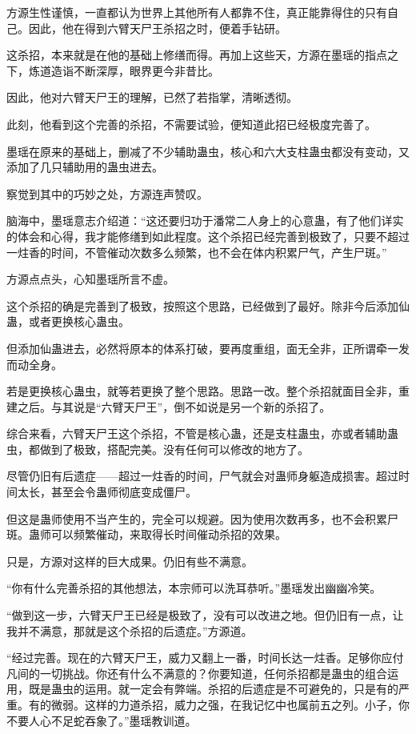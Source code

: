 
\begin{this_body}

方源生性谨慎，一直都认为世界上其他所有人都靠不住，真正能靠得住的只有自己。因此，他在得到六臂天尸王杀招之时，便着手钻研。

这杀招，本来就是在他的基础上修缮而得。再加上这些天，方源在墨瑶的指点之下，炼道造诣不断深厚，眼界更今非昔比。

因此，他对六臂天尸王的理解，已然了若指掌，清晰透彻。

此刻，他看到这个完善的杀招，不需要试验，便知道此招已经极度完善了。

墨瑶在原来的基础上，删减了不少辅助蛊虫，核心和六大支柱蛊虫都没有变动，又添加了几只辅助用的蛊虫进去。

察觉到其中的巧妙之处，方源连声赞叹。

脑海中，墨瑶意志介绍道：“这还要归功于潘常二人身上的心意蛊，有了他们详实的体会和心得，我才能修缮到如此程度。这个杀招已经完善到极致了，只要不超过一炷香的时间，不管催动次数多么频繁，也不会在体内积累尸气，产生尸斑。”

方源点点头，心知墨瑶所言不虚。

这个杀招的确是完善到了极致，按照这个思路，已经做到了最好。除非今后添加仙蛊，或者更换核心蛊虫。

但添加仙蛊进去，必然将原本的体系打破，要再度重组，面无全非，正所谓牵一发而动全身。

若是更换核心蛊虫，就等若更换了整个思路。思路一改。整个杀招就面目全非，重建之后。与其说是“六臂天尸王”，倒不如说是另一个新的杀招了。

综合来看，六臂天尸王这个杀招，不管是核心蛊，还是支柱蛊虫，亦或者辅助蛊虫，都做到了极致，搭配完美。没有任何可以修改的地方了。

尽管仍旧有后遗症——超过一炷香的时间，尸气就会对蛊师身躯造成损害。超过时间太长，甚至会令蛊师彻底变成僵尸。

但这是蛊师使用不当产生的，完全可以规避。因为使用次数再多，也不会积累尸斑。蛊师可以频繁催动，来取得长时间催动杀招的效果。

只是，方源对这样的巨大成果。仍旧有些不满意。

“你有什么完善杀招的其他想法，本宗师可以洗耳恭听。”墨瑶发出幽幽冷笑。

“做到这一步，六臂天尸王已经是极致了，没有可以改进之地。但仍旧有一点，让我并不满意，那就是这个杀招的后遗症。”方源道。

“经过完善。现在的六臂天尸王，威力又翻上一番，时间长达一炷香。足够你应付凡间的一切挑战。你还有什么不满意的？你要知道，任何杀招都是蛊虫的组合运用，既是蛊虫的运用。就一定会有弊端。杀招的后遗症是不可避免的，只是有的严重。有的微弱。这样的力道杀招，威力之强，在我记忆中也属前五之列。小子，你不要人心不足蛇吞象了。”墨瑶教训道。


\end{this_body}
